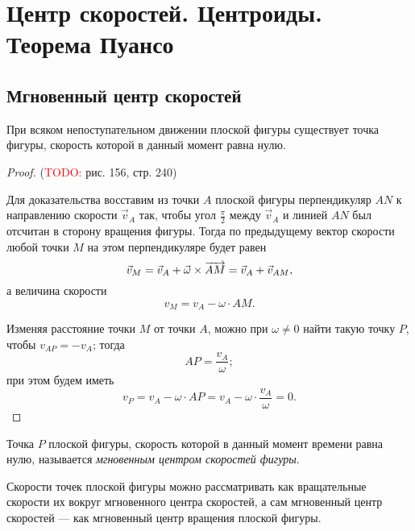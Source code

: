 \section{Центр скоростей. Центроиды. Теорема Пуансо}

\subsection{Мгновенный центр скоростей}

\begin{theorem}
  При всяком непоступательном движении плоской фигуры существует точка фигуры,
  скорость которой в данный момент равна нулю.
\end{theorem}

\begin{proof}
  (\textcolor{red}{TODO:} рис. 156, стр. 240)

  Для доказательства восставим из точки $A$ плоской фигуры перпендикуляр $AN$ к
  направлению скорости $\vec{v}_A$ так, чтобы угол $\frac{\pi}{2}$ между
  $\vec{v}_A$ и линией $AN$ был отсчитан в сторону вращения фигуры. Тогда по
  предыдущему вектор скорости любой точки $M$ на этом перпендикуляре будет равен
  \begin{equation*}
    \vec{v}_M = \vec{v}_A + \vec{\omega} \times \overrightarrow{AM} = \vec{v}_A +
      \vec{v}_{AM},
  \end{equation*}
  а величина скорости
  \begin{equation*}
    v_M = v_A - \omega \cdot AM.
  \end{equation*}

  Изменяя расстояние точки $M$ от точки $A$, можно при $\omega \neq 0$ найти
  такую точку $P$, чтобы $v_{AP} = -v_A$; тогда
  \begin{equation*}
    AP = \frac{v_A}{\omega};
  \end{equation*}
  при этом будем иметь
  \begin{equation*}
    v_P = v_A - \omega \cdot AP = v_A - \omega \cdot \frac{v_A}{\omega} = 0.
  \end{equation*}
\end{proof}

\begin{definition}
  Точка $P$ плоской фигуры, скорость которой в данный момент времени равна нулю,
  называется \textit{мгновенным центром скоростей фигуры}.
\end{definition}

Скорости точек плоской фигуры можно рассматривать как вращательные скорости их
вокруг мгновенного центра скоростей, а сам мгновенный центр скоростей --- как
мгновенный центр вращения плоской фигуры.

